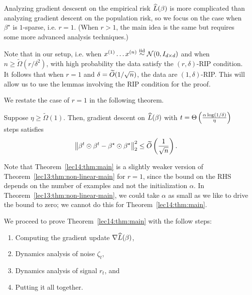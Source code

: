 


Analyzing gradient descsent on the empirical risk $\widehat{L}(\beta)$ is more complicated than analyzing gradient descent on the population risk, so we focus on the case when $\beta^\star$ is $1$-sparse, i.e. $r=1$. (When $r>1$, the main idea is the same but requires some more advanced analysis techniques.) 

Note that in our setup, i.e. when $x^{(1)} \ldots x^{(n)} \overset{\textup{iid}}{\sim} \mathcal{N}(0, I_{d\times d})$ and when $n\geq \widetilde{\Omega}(r/\delta^2)$, with high probability the data satisfy the $(r, \delta)$-RIP condition. It follows that when $r=1$ and $\delta = \widetilde{O}(1/\sqrt{n})$, the data are $(1, \delta)$-RIP. This will allow us to use the lemmas involving the RIP condition for the proof.

We restate the case of $r=1$ in the following theorem.
 
\begin{theorem} \label{lec14:thm:main}
Suppose $\eta \geq \widetilde{\Omega}(1).$ Then, gradient descent on $\widehat{L}(\beta)$ with $t = \Theta \left(\frac{\alpha \log (1/\delta)}{\eta}\right)$ steps satisfies 
\begin{equation}
\left\|\beta^{t} \odot \beta^{t} - \beta^\star \odot \beta^\star\right\|_{2}^{2} \leq \widetilde{O}\left(\frac{1}{\sqrt{n}}\right).
\end{equation} 
\end{theorem}

\begin{remark}
Note that Theorem~\ref{lec14:thm:main} is a slightly weaker version of Theorem~\ref{lec13:thm:non-linear-main} for $r=1$, since the bound on the RHS depends on the number of examples and not the initialization $\alpha$. In Theorem~\ref{lec13:thm:non-linear-main}, we could take $\alpha$ as small as we like to drive the bound to zero; we cannot do this for Theorem~\ref{lec14:thm:main}.
\end{remark}

We proceed to prove Theorem~\ref{lec14:thm:main} with the follow steps:
\begin{enumerate}
\item Computing the gradient update $\nabla \widehat{L}(\beta)$,
\item Dynamics analysis of noise $\zeta_t$, 
\item Dynamics analysis of signal $r_t$, and
\item Putting it all together.
\end{enumerate}

